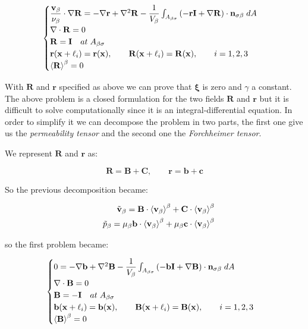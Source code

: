 \begin{eqnarray}
	\begin{cases}
		\dfrac{\textbf{v}_{\beta}}{\nu_{\beta}} \cdot  \nabla \mathbf{R} = -\nabla \mathbf{r} + \nabla^2 \mathbf{R} - \dfrac{1}{V_\beta} \int_{A_{\beta \sigma}} \left(-\mathbf{r}\mathbf{I}  +  \nabla \mathbf{R} \right) \cdot \mathbf{n}_{\sigma \beta} \;dA  \\
		\nabla \cdot \mathbf{R} = 0  \\
		\mathbf{R} = \mathbf{I} \quad at \; A_{\beta \sigma} \\
		\mathbf{r}(\mathbf{x} +\ell_i) = \mathbf{r}(\mathbf{x}), \qquad \mathbf{R}(\mathbf{x} +\ell_i) = \mathbf{R}(\mathbf{x}), \qquad i=1,2,3 \\
		{\left< \mathbf{R} \right>}^{\beta} = 0
	\end{cases}
\label{eq:R_problem}
\end{eqnarray}

With  $\mathbf{R}$ and $\mathbf{r}$ specified as above we can prove that $\boldsymbol{\xi}$ is zero and $\gamma$ a constant.
The above problem is a closed formulation for the two fields  $\mathbf{R}$ and $\mathbf{r}$ but it is difficult to solve computationally since it is an integral-differential equation.
In order to simplify it we can decompose the problem in two parts, the first one give us the \textit{permeability tensor} and the second one the \textit{Forchheimer tensor}.

We represent $\mathbf{R}$ and $\mathbf{r}$ as:

$$
 \mathbf{R} = \mathbf{B} + \mathbf{C}, \qquad \mathbf{r} = \mathbf{b} + \mathbf{c}
$$

So the previous decomposition became:

\begin{eqnarray}
	&& \tilde{\textbf{v}}_{\beta} = \mathbf{B} \cdot {\left< \textbf{v}_{\beta}\right>}^{\beta} + \mathbf{C} \cdot {\left< \textbf{v}_{\beta}\right>}^{\beta}  \\
	&& \tilde{p}_{\beta} = \mu_{\beta} \mathbf{b} \cdot {\left< \textbf{v}_{\beta}\right>}^{\beta} + \mu_{\beta} \mathbf{c} \cdot {\left< \textbf{v}_{\beta}\right>}^{\beta}
	\label{eq:closure_viab_divison}
\end{eqnarray}

so the first problem became:

\begin{eqnarray}
	\begin{cases}
		0 = -\nabla \mathbf{b} + \nabla^2 \mathbf{B} - \dfrac{1}{V_\beta} \int_{A_{\beta \sigma}}  \left(-\mathbf{b}\mathbf{I}  +  \nabla \mathbf{B} \right) \cdot \mathbf{n}_{\sigma \beta} \;dA  \\
		\nabla \cdot \mathbf{B} = 0  \\
		\mathbf{B} = -\mathbf{I} \quad at \; A_{\beta \sigma} \\
		\mathbf{b}(\mathbf{x} +\ell_i) = \mathbf{b}(\mathbf{x}), \qquad \mathbf{B}(\mathbf{x} +\ell_i) = \mathbf{B}(\mathbf{x}), \qquad i=1,2,3 \\
		{\left< \mathbf{B} \right>}^{\beta} = 0
	\end{cases}
\label{eq:B_problem}
\end{eqnarray}

